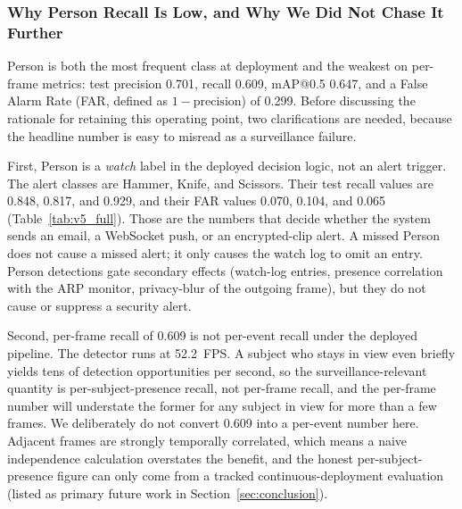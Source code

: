 \documentclass{ieeeaccess}
\begin{document}
\subsubsection{Why Person Recall Is Low, and Why We Did Not Chase It Further}
\label{sec:person_recall_discussion}
Person is both the most frequent class at deployment and the weakest on per-frame metrics: test precision 0.701, recall 0.609, mAP{@}0.5 0.647, and a False Alarm Rate (FAR, defined as $1 - \text{precision}$) of 0.299. Before discussing the rationale for retaining this operating point, two clarifications are needed, because the headline number is easy to misread as a surveillance failure.

First, Person is a \emph{watch} label in the deployed decision logic, not an alert trigger. The alert classes are Hammer, Knife, and Scissors. Their test recall values are 0.848, 0.817, and 0.929, and their FAR values 0.070, 0.104, and 0.065 (Table~\ref{tab:v5_full}). Those are the numbers that decide whether the system sends an email, a WebSocket push, or an encrypted-clip alert. A missed Person does not cause a missed alert; it only causes the watch log to omit an entry. Person detections gate secondary effects (watch-log entries, presence correlation with the ARP monitor, privacy-blur of the outgoing frame), but they do not cause or suppress a security alert.

Second, per-frame recall of 0.609 is not per-event recall under the deployed pipeline. The detector runs at 52.2~FPS. A subject who stays in view even briefly yields tens of detection opportunities per second, so the surveillance-relevant quantity is per-subject-presence recall, not per-frame recall, and the per-frame number will understate the former for any subject in view for more than a few frames. We deliberately do not convert 0.609 into a per-event number here. Adjacent frames are strongly temporally correlated, which means a naive independence calculation overstates the benefit, and the honest per-subject-presence figure can only come from a tracked continuous-deployment evaluation (listed as primary future work in Section~\ref{sec:conclusion}).
\end{document}
